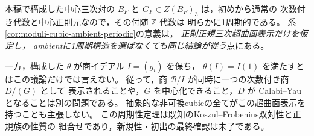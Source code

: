 \begin{remark}[適用範囲と既知結果との関係]\label{rem:moduli-ambient-pair-scope}
本稿で構成した中心三次対の $B_F$ と
$G_F\in Z(B_F)_3$ は，初めから通常の
次数付き代数と中心正則元なので，その付随 $\mathbb Z$-代数は
明らかに1周期的である。
系\ref{cor:moduli-cubic-ambient-periodic}の意義は，
\emph{正則正規三次超曲面表示だけを仮定し，
ambientに1周期構造を選ばなくても同じ結論が従う}点にある。

一方，構成した $\theta$ が商イデアル $I=(g_i)$ を保ち，
$\theta(I)=I(1)$ を満たすとはこの議論だけでは言えない。
従って，商 $\mathcal B/I$ が同時に一つの次数付き商 $D/(G)$ として
表示されることや，$G$ を中心化できること，$D$ が
Calabi--Yauとなることは別の問題である。
抽象的な非可換cubicの全てがこの超曲面表示を持つことも主張しない。
この周期性定理は既知のKoszul--Frobenius双対性と正規族の性質の
組合せであり，新規性・初出の最終確認は未了である。
\end{remark}
